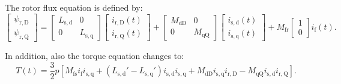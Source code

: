 \begin{solutionblock}
    The rotor flux equation is defined by:
    \begin{equation}
        \begin{bmatrix}
            \psi_{\mathrm{r,D}} \\
            \psi_{\mathrm{r,Q}}
        \end{bmatrix}
        =
        \begin{bmatrix}
            L_{\mathrm{s,d}} & 0 \\
            0   & L_{\mathrm{s,q}}
        \end{bmatrix}
        \begin{bmatrix}
            i_{\mathrm{r,D}}(t) \\
            i_{\mathrm{r,Q}}(t)
        \end{bmatrix}
        +
        \begin{bmatrix}
            M_{\mathrm{dD}}     & 0 \\
            0       & M_{\mathrm{qQ}}
        \end{bmatrix}
        \begin{bmatrix}
            i_{\mathrm{s,d}}(t) \\
            i_{\mathrm{s,q}}(t)
        \end{bmatrix}
        + M_{\mathrm{fr}}
        \begin{bmatrix}
            1 \\
            0
        \end{bmatrix}
        i_{\mathrm{f}}(t).
    \end{equation}


    In addition, also the torque equation changes to:
    \begin{equation}
        T(t) = \frac{3}{2}p\left[M_{\mathrm{fs}} i_{\mathrm{f}} i_{\mathrm{s,q}} + \left(L_{\mathrm{s,d}}' - L_{\mathrm{s,q}}'\right) i_{\mathrm{s,d}} i_{\mathrm{s,q}} + M_{\mathrm{dD}} i_{\mathrm{s,q}} i_{\mathrm{r,D}} - M_{\mathrm{qQ}} i_{\mathrm{s,d}} i_{\mathrm{r,Q}} \right].
    \end{equation}



\end{solutionblock}
